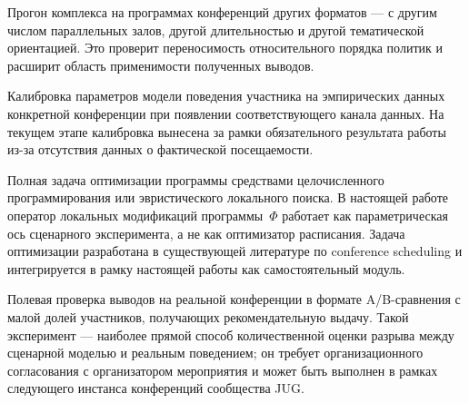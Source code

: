 Прогон комплекса на программах конференций других форматов --- с другим числом параллельных залов, другой длительностью и другой тематической ориентацией. Это проверит переносимость относительного порядка политик и расширит область применимости полученных выводов.

Калибровка параметров модели поведения участника на эмпирических данных конкретной конференции при появлении соответствующего канала данных. На текущем этапе калибровка вынесена за рамки обязательного результата работы из-за отсутствия данных о фактической посещаемости.

Полная задача оптимизации программы средствами целочисленного программирования или эвристического локального поиска. В настоящей работе оператор локальных модификаций программы~$\Phi$ работает как параметрическая ось сценарного эксперимента, а не как оптимизатор расписания. Задача оптимизации разработана в существующей литературе по conference scheduling и интегрируется в рамку настоящей работы как самостоятельный модуль.

Полевая проверка выводов на реальной конференции в формате A/B-сравнения с малой долей участников, получающих рекомендательную выдачу. Такой эксперимент --- наиболее прямой способ количественной оценки разрыва между сценарной моделью и реальным поведением; он требует организационного согласования с организатором мероприятия и может быть выполнен в рамках следующего инстанса конференций сообщества JUG.

